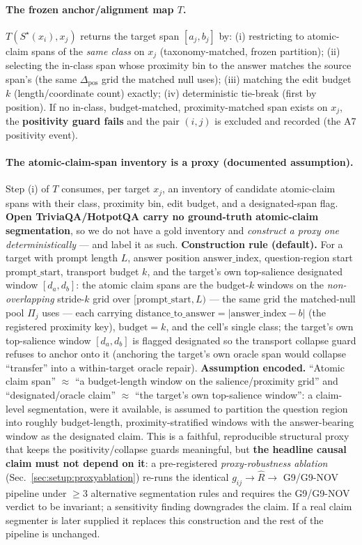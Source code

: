 \documentclass[11pt]{article}
\theoremstyle{plain}
\theoremstyle{definition}
\newcommand{\Rhat}{\widehat{R}}
\newcommand{\Pij}{\Pi_j}
\newcommand{\dpos}{\Delta_{\mathrm{pos}}}
\newcommand{\Sstar}{S^{\star}}
\begin{document}
\paragraph{The frozen anchor/alignment map $T$.} $T(\Sstar(x_i),x_j)$ returns the
target span $[a_j,b_j]$ by: (i) restricting to atomic-claim spans of the
\emph{same class} on $x_j$ (taxonomy-matched, frozen partition); (ii) selecting the
in-class span whose proximity bin to the answer matches the source span's
(the same $\dpos$ grid the matched null uses); (iii) matching the edit budget $k$
(length/coordinate count) exactly; (iv) deterministic tie-break (first by position).
If no in-class, budget-matched, proximity-matched span exists on $x_j$, the
\textbf{positivity guard fails} and the pair $(i,j)$ is excluded and recorded (the
A7 positivity event).

\paragraph{The atomic-claim-span inventory is a proxy (documented assumption).}
Step (i) of $T$ consumes, per target $x_j$, an inventory of candidate atomic-claim
spans with their class, proximity bin, edit budget, and a designated-span flag.
\textbf{Open TriviaQA/HotpotQA carry no ground-truth atomic-claim segmentation}, so we
do not have a gold inventory and \emph{construct a proxy one deterministically} --- and
label it as such. \textbf{Construction rule (default).} For a target with prompt length
$L$, answer position $\mathrm{answer\_index}$, question-region start
$\mathrm{prompt\_start}$, transport budget $k$, and the target's own top-salience
designated window $[d_a,d_b]$: the atomic claim spans are the budget-$k$ windows on the
\emph{non-overlapping} stride-$k$ grid over $[\mathrm{prompt\_start},L)$ --- the same
grid the matched-null pool $\Pij$ uses --- each carrying
$\mathrm{distance\_to\_answer}=|\mathrm{answer\_index}-b|$ (the registered proximity
key), $\mathrm{budget}=k$, and the cell's single class; the target's own
top-salience window $[d_a,d_b]$ is flagged designated so the transport collapse guard
refuses to anchor onto it (anchoring the target's own oracle span would collapse
``transfer'' into a within-target oracle repair). \textbf{Assumption encoded.} ``Atomic
claim span'' $\approx$ ``a budget-length window on the salience/proximity grid'' and
``designated/oracle claim'' $\approx$ ``the target's own top-salience window'': a
claim-level segmentation, were it available, is assumed to partition the question
region into roughly budget-length, proximity-stratified windows with the answer-bearing
window as the designated claim. This is a faithful, reproducible structural proxy that
keeps the positivity/collapse guards meaningful, but \textbf{the headline causal claim
must not depend on it}: a pre-registered \emph{proxy-robustness ablation}
(Sec.~\ref{sec:setup:proxyablation}) re-runs the identical $g_{ij}\!\to\!\Rhat\!\to$
G9/G9-NOV pipeline under $\ge3$ alternative segmentation rules and requires the G9/G9-NOV
verdict to be invariant; a sensitivity finding downgrades the claim. If a real claim
segmenter is later supplied it replaces this construction and the rest of the pipeline
is unchanged.
\end{document}
